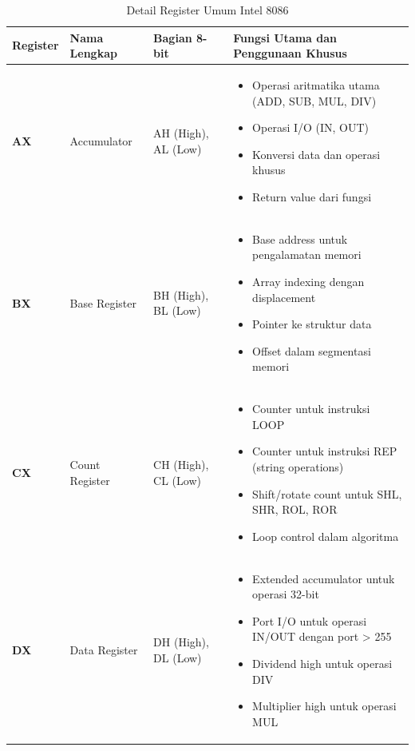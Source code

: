 \begin{table}[h]
\centering
\caption{Detail Register Umum Intel 8086}
\begin{tabular}{|p{2cm}|p{3cm}|p{4cm}|p{6cm}|}
\hline
\textbf{Register} & \textbf{Nama Lengkap} & \textbf{Bagian 8-bit} & \textbf{Fungsi Utama dan Penggunaan Khusus} \\
\hline
\textbf{AX} & Accumulator & AH (High), AL (Low) & \begin{itemize}
\item Operasi aritmatika utama (ADD, SUB, MUL, DIV)
\item Operasi I/O (IN, OUT)
\item Konversi data dan operasi khusus
\item Return value dari fungsi
\end{itemize} \\
\hline
\textbf{BX} & Base Register & BH (High), BL (Low) & \begin{itemize}
\item Base address untuk pengalamatan memori
\item Array indexing dengan displacement
\item Pointer ke struktur data
\item Offset dalam segmentasi memori
\end{itemize} \\
\hline
\textbf{CX} & Count Register & CH (High), CL (Low) & \begin{itemize}
\item Counter untuk instruksi LOOP
\item Counter untuk instruksi REP (string operations)
\item Shift/rotate count untuk SHL, SHR, ROL, ROR
\item Loop control dalam algoritma
\end{itemize} \\
\hline
\textbf{DX} & Data Register & DH (High), DL (Low) & \begin{itemize}
\item Extended accumulator untuk operasi 32-bit
\item Port I/O untuk operasi IN/OUT dengan port > 255
\item Dividend high untuk operasi DIV
\item Multiplier high untuk operasi MUL
\end{itemize} \\
\hline
\end{tabular}
\label{tab:general-registers-detail}
\end{table}

